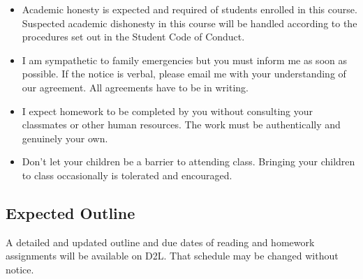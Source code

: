 \documentclass[letterpaper,10pt]{article}
\begin{document}
\begin{itemize}
\item Academic honesty is expected and required of students enrolled
  in this course.  Suspected academic dishonesty in this course will
  be handled according to the procedures set out in the Student Code
  of Conduct.

\item I am sympathetic to family emergencies but you must inform me as
  soon as possible. If the notice is verbal, please email me with your
  understanding of our agreement. All agreements have to be in
  writing.
  
\item I expect homework to be completed by you without consulting your classmates or other human resources.  The work must be authentically and genuinely your own.

\item Don't let your children be a barrier to attending class. Bringing your children to class occasionally is tolerated and encouraged.


\end{itemize}

 
\subsection{Expected Outline}
A detailed and updated outline and due dates of reading and homework assignments will be available on D2L.  That schedule may be changed without notice.
\end{document}
